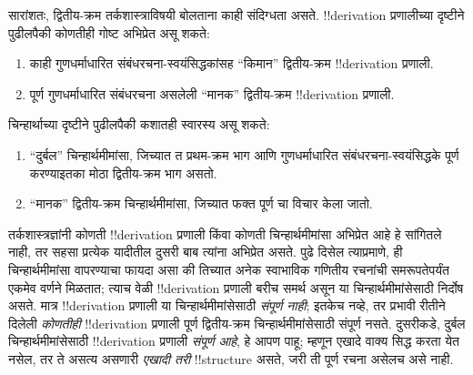\documentclass[../../../include/open-logic-section]{subfiles}
\begin{document}
सारांशतः, द्वितीय-क्रम तर्कशास्त्राविषयी बोलताना काही संदिग्धता असते.
!!{derivation} प्रणालीच्या दृष्टीने पुढीलपैकी कोणतीही गोष्ट अभिप्रेत असू शकते:
\begin{enumerate}
\item काही गुणधर्माधारित संबंधरचना-स्वयंसिद्धकांसह “किमान” द्वितीय-क्रम
  !!{derivation} प्रणाली.
\item पूर्ण गुणधर्माधारित संबंधरचना असलेली “मानक” द्वितीय-क्रम
  !!{derivation} प्रणाली.
\end{enumerate}
चिन्हार्थाच्या दृष्टीने पुढीलपैकी कशातही स्वारस्य असू शकते:
\begin{enumerate}
\item “दुर्बल” चिन्हार्थमीमांसा, जिच्यात त प्रथम-क्रम
  भाग आणि गुणधर्माधारित संबंधरचना-स्वयंसिद्धके पूर्ण करण्याइतका मोठा
  द्वितीय-क्रम भाग असतो.
\item “मानक” द्वितीय-क्रम चिन्हार्थमीमांसा, जिच्यात फक्त पूर्ण
  चा विचार केला जातो.
\end{enumerate}
तर्कशास्त्रज्ञांनी कोणती !!{derivation} प्रणाली किंवा कोणती चिन्हार्थमीमांसा
अभिप्रेत आहे हे सांगितले नाही, तर सहसा प्रत्येक यादीतील दुसरी बाब त्यांना
अभिप्रेत असते. पुढे दिसेल त्याप्रमाणे, ही चिन्हार्थमीमांसा वापरण्याचा फायदा असा
की तिच्यात अनेक स्वाभाविक गणितीय रचनांची समरूपतेपर्यंत एकमेव वर्णने मिळतात;
त्याच वेळी !!{derivation} प्रणाली बरीच समर्थ असून या चिन्हार्थमीमांसेसाठी
निर्दोष असते. मात्र !!{derivation} प्रणाली या चिन्हार्थमीमांसेसाठी
\emph{संपूर्ण नाही}; इतकेच नव्हे, तर प्रभावी रीतीने दिलेली \emph{कोणतीही}
!!{derivation} प्रणाली पूर्ण द्वितीय-क्रम चिन्हार्थमीमांसेसाठी संपूर्ण नसते.
दुसरीकडे, दुर्बल चिन्हार्थमीमांसेसाठी !!{derivation} प्रणाली \emph{संपूर्ण
आहे}, हे आपण पाहू; म्हणून एखादे वाक्य सिद्ध करता येत नसेल, तर ते असत्य असणारी
\emph{एखादी तरी} !!{structure} असते, जरी ती पूर्ण रचना असेलच असे नाही.
\end{document}

